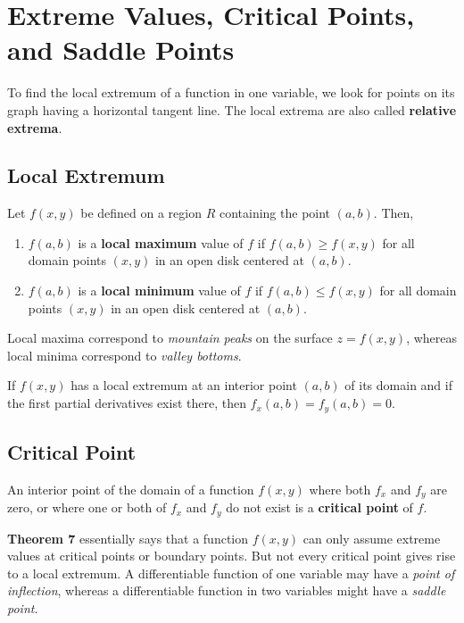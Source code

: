 \section{Extreme Values, Critical Points, and Saddle Points}

To find the local extremum of a function in one variable, we look for points on its graph having a horizontal tangent line.
The local extrema are also called \textbf{relative extrema}.

\subsection{Local Extremum}
Let $f(x, y)$ be defined on a region $R$ containing the point $(a, b)$. Then,

\begin{enumerate}
    \item $f(a, b)$ is a \textbf{local maximum} value of $f$ if $f(a, b) \geq f(x, y)$ for all domain points $(x, y)$ in an
    open disk centered at $(a, b)$.

    \item $f(a, b)$ is a \textbf{local minimum} value of $f$ if $f(a, b) \leq f(x, y)$ for all domain points $(x, y)$ in an
    open disk centered at $(a, b)$.
\end{enumerate}

Local maxima correspond to \textit{mountain peaks} on the surface $z = f(x, y)$, whereas local minima correspond to
\textit{valley bottoms}.

\begin{theorem}
    If $f(x, y)$ has a local extremum at an interior point $(a, b)$ of its domain and if the first partial derivatives exist
    there, then $f_x(a, b) = f_y(a, b) = 0$.
\end{theorem}


\subsection{Critical Point}
An interior point of the domain of a function $f(x, y)$ where both $f_x$ and $f_y$ are zero, or where one or both of $f_x$
and $f_y$ do not exist is a \textbf{critical point} of $f$.

\textbf{Theorem 7} essentially says that a function $f(x, y)$ can only assume extreme values at critical points or boundary
points. But not every critical point gives rise to a local extremum. A differentiable function of one variable may have a
\textit{point of inflection}, whereas a differentiable function in two variables might have a \textit{saddle point}.

